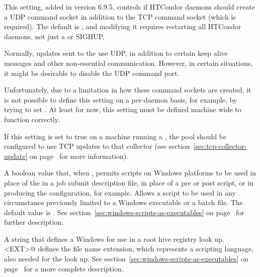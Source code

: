 \begin{description}
\label{param:WantUDPCommandSocket}
\item[\Macro{WANT\_UDP\_COMMAND\_SOCKET}]
  This setting, added in version 6.9.5, controls if HTCondor daemons
  should create a UDP command socket in addition to the TCP command
  socket (which is required).
  The default is , and modifying it requires restarting all
  HTCondor daemons, not just a  or SIGHUP.

  Normally, updates sent to the  use UDP, in
  addition to certain keep alive messages and other non-essential
  communication.
  However, in certain situations, it might be desirable to disable the
  UDP command port.

  Unfortunately, due to a limitation in how these command sockets are
  created, it is not possible to define this setting on a per-daemon
  basis, for example, by trying to set
  .
  At least for now, this setting must be defined machine wide to
  function correctly.

  If this setting is set to true on a machine running a
  , the pool should be configured to use TCP updates
  to that collector (see section~\ref{sec:tcp-collector-update} on
  page~\pageref{sec:tcp-collector-update} for more information).

\label{param:AllowScriptsToRunAsExecutables}
\item[\Macro{ALLOW\_SCRIPTS\_TO\_RUN\_AS\_EXECUTABLES}]
  A boolean value that, when , permits scripts on Windows
  platforms to be used in place of the  in a job
  submit description file, in place of a  pre or post script,
  or in producing the configuration, for example. 
  Allows a script to be used in any circumstance previously
  limited to a Windows executable or a batch file.
  The default value is .
  See section~\ref{sec:windows-scripts-as-executables} on
  page~\pageref{sec:windows-scripts-as-executables} for further description.

\label{param:OpenVerbForExtFiles}
\item[\Macro{OPEN\_VERB\_FOR\_<EXT>\_FILES}]
  A string that defines a Windows  for use in a root hive
  registry look up.
  \verb@<EXT>@ defines the file name extension, which represents a
  scripting language, also needed for the look up.
  See section~\ref{sec:windows-scripts-as-executables} on
  page~\pageref{sec:windows-scripts-as-executables} for a more complete
  description.


\end{description}
